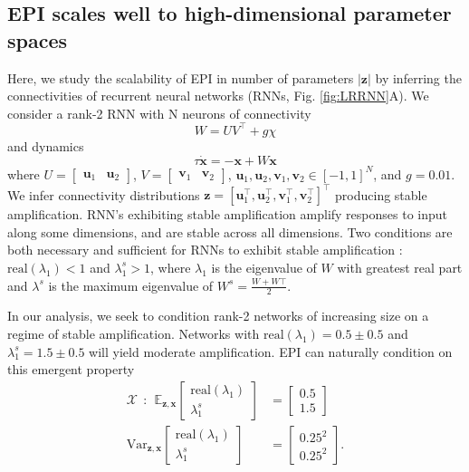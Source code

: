 \documentclass[11pt]{article}
\begin{document}
\subsection{EPI scales well to high-dimensional parameter spaces} \label{results_LRRNN}
Here, we study the scalability of EPI in number of parameters $|\mathbf{z}|$ by inferring the connectivities of recurrent neural networks (RNNs, Fig. \ref{fig:LRRNN}A). 
 We consider a rank-2 RNN with N neurons of connectivity
\begin{equation}
 W = UV^\top + g\chi
 \end{equation}
 and dynamics
 \begin{equation}
 \tau \dot{\mathbf{x}} = -\mathbf{x} + W\mathbf{x}
 \end{equation}
where $U = \begin{bmatrix} \mathbf{u}_1 & \mathbf{u}_2 \end{bmatrix}$, $V = \begin{bmatrix} \mathbf{v}_1 & \mathbf{v}_2 \end{bmatrix}$, $\mathbf{u}_1, \mathbf{u}_2, \mathbf{v}_1, \mathbf{v}_2 \in \left[-1, 1 \right]^N$, and $g=0.01$.  We  infer connectivity distributions $\mathbf{z} = \left[\mathbf{u}_1^\top, \mathbf{u}_2^\top, \mathbf{v}_1^\top, \mathbf{v}_2^\top \right]^\top$   producing stable amplification.
RNN's exhibiting stable amplification amplify responses to input along some dimensions, and are stable across all dimensions.
Two conditions are both necessary and sufficient for RNNs to exhibit stable amplification \cite{bondanelli2020coding}:  $\text{real}(\lambda_1) < 1$ and
$\lambda^s_1 > 1$, where $\lambda_1$ is the eigenvalue of $W$ with greatest real part and $\lambda^s$ is the maximum eigenvalue of $W^s = \frac{W + W\top}{2}$.

In our analysis, we seek to condition rank-2 networks of increasing size on a regime of stable amplification.  
Networks with $\text{real}(\lambda_1) = 0.5 \pm 0.5$ and $\lambda_1^s = 1.5 \pm 0.5$ will yield moderate amplification.
 EPI can naturally condition on this emergent property
\begin{equation}\label{eq:EP_LRRNN}
\begin{split}
\mathcal{X} ~~:~~ \mathbb{E}_{\mathbf{z}, \mathbf{x}} \begin{bmatrix} \text{real}(\lambda_1) \\ \lambda^s_1 \end{bmatrix} &= \begin{bmatrix} 0.5 \\ 1.5 \end{bmatrix} \\
\text{Var}_{\mathbf{z}, \mathbf{x}} \begin{bmatrix} \text{real}(\lambda_1) \\ \lambda^s_1 \end{bmatrix} &= \begin{bmatrix} 0.25^2 \\ 0.25^2 \end{bmatrix} .
\end{split}
\end{equation}
\end{document}
